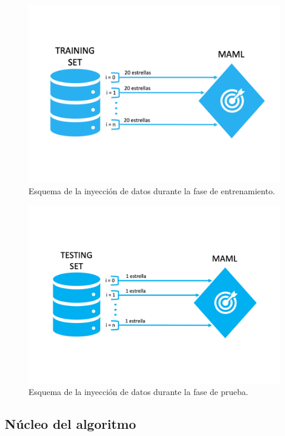 \begin{figure}[H]
\begin{center}
 \includegraphics[width=0.8\linewidth]{Figuras/MAML/train_data.pdf}
\end{center}
\caption{Esquema de la inyección de datos durante la fase de entrenamiento.}
 \label{fig:input_data_train}
\end{figure}

\begin{figure}[H]
\begin{center}
 \includegraphics[width=0.8\linewidth]{Figuras/MAML/test_data.pdf}
\end{center}
\caption{Esquema de la inyección de datos durante la fase de prueba.}
 \label{fig:input_data_test}
\end{figure}


\subsection{Núcleo del algoritmo} 

